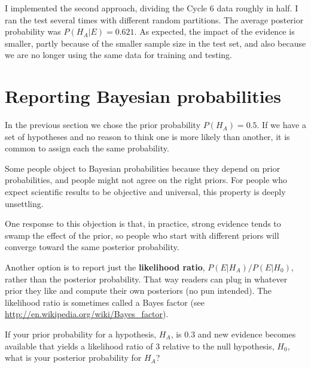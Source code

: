 \documentclass[12pt]{book}
\begin{document}

I implemented the second approach, dividing the Cycle 6 data roughly
in half.  I ran the test several times with different random partitions.
The average posterior probability was $P(H_A | E) = 0.621$.  As
expected, the impact of the evidence is smaller, partly because of
the smaller sample size in the test set, and also because we are
no longer using the same data for training and testing.



\section{Reporting Bayesian probabilities}

In the previous section we chose the prior probability $P(H_A) = 0.5$.
If we have a set of hypotheses and no reason to think one is more
likely than another, it is common to assign each the same probability.

Some people object to Bayesian probabilities because they depend on
prior probabilities, and people might not agree on
the right priors.  For people who expect scientific results to be
objective and universal, this property is deeply unsettling.


One response to this objection is that, in practice, strong evidence
tends to swamp the effect of the prior, so people who start with
different priors will converge toward the same posterior
probability.


Another option is to report just the {\bf likelihood ratio}, 
$P(E | H_A)/P(E | H_0)$, rather than the posterior probability.  That way
readers can plug in whatever prior they like and compute their own
posteriors (no pun intended).  The likelihood ratio is sometimes
called a Bayes factor (see \url{http://en.wikipedia.org/wiki/Bayes_factor}).

\begin{ex}


If your prior probability for a hypothesis, $H_A$, is 0.3 and new
evidence becomes available that yields a likelihood ratio of 3
relative to the null hypothesis, $H_0$, what is your posterior
probability for $H_A$?


\end{ex}
\end{document}
